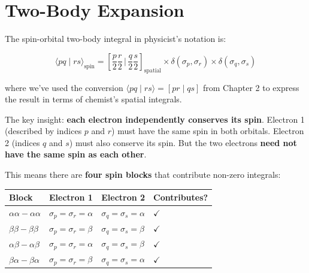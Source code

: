 \documentclass[
  11pt,
  oneside]{book}
\begin{document}
\section{Two-Body Expansion}\label{two-body-expansion}

The spin-orbital two-body integral in physicist's notation is:

\[\langle pq \mid rs\rangle_{\text{spin}} = \left[\frac{p}{2}\frac{r}{2}\,\bigg|\,\frac{q}{2}\frac{s}{2}\right]_{\text{spatial}} \times \delta(\sigma_p, \sigma_r) \times \delta(\sigma_q, \sigma_s)\]

where we've used the conversion
\(\langle pq \mid rs\rangle = [pr \mid qs]\) from Chapter 2 to express
the result in terms of chemist's spatial integrals.

The key insight: \textbf{each electron independently conserves its
spin}. Electron 1 (described by indices \(p\) and \(r\)) must have the
same spin in both orbitals. Electron 2 (indices \(q\) and \(s\)) must
also conserve its spin. But the two electrons \textbf{need not have the
same spin as each other}.

This means there are \textbf{four spin blocks} that contribute non-zero
integrals:

\begin{longtable}[]{@{}
  >{\centering\arraybackslash}p{}
  >{\centering\arraybackslash}p{}
  >{\centering\arraybackslash}p{}
  >{\centering\arraybackslash}p{}@{}}
\toprule\noalign{}
\begin{minipage}[b]{\linewidth}\centering
Block
\end{minipage} & \begin{minipage}[b]{\linewidth}\centering
Electron 1
\end{minipage} & \begin{minipage}[b]{\linewidth}\centering
Electron 2
\end{minipage} & \begin{minipage}[b]{\linewidth}\centering
Contributes?
\end{minipage} \\
\midrule\noalign{}
\endhead
\bottomrule\noalign{}
\endlastfoot
\(\alpha\alpha - \alpha\alpha\) & \(\sigma_p = \sigma_r = \alpha\) &
\(\sigma_q = \sigma_s = \alpha\) & $\checkmark$ \\
\(\beta\beta - \beta\beta\) & \(\sigma_p = \sigma_r = \beta\) &
\(\sigma_q = \sigma_s = \beta\) & $\checkmark$ \\
\(\alpha\beta - \alpha\beta\) & \(\sigma_p = \sigma_r = \alpha\) &
\(\sigma_q = \sigma_s = \beta\) & $\checkmark$ \\
\(\beta\alpha - \beta\alpha\) & \(\sigma_p = \sigma_r = \beta\) &
\(\sigma_q = \sigma_s = \alpha\) & $\checkmark$ \\
\end{longtable}
\end{document}
